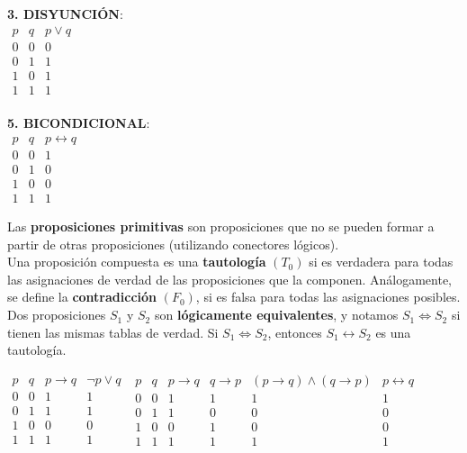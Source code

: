 \documentclass[11pt,a4paper]{article}
\begin{document}
\begin{multicols}{3}
\noindent \textbf{3. DISYUNCI\'ON}: \\
\indent $\begin{array}{|cc|c|}
p & q & p \lor q\\
\hline
0 & 0 & 0\\
0 & 1 & 1\\
1 & 0 & 1\\
1 & 1 & 1
\end{array}$\\ \\

\noindent \textbf{5. BICONDICIONAL}: \\
\indent $\begin{array}{|cc|c|}
p & q & p \leftrightarrow q\\
\hline
0 & 0 & 1\\
0 & 1 & 0\\
1 & 0 & 0\\
1 & 1 & 1
\end{array}$\\
\end{multicols}

\noindent Las \textbf{proposiciones primitivas} son proposiciones que no se pueden formar a partir de otras proposiciones (utilizando conectores l\'ogicos).\\

\noindent Una proposici\'on compuesta es una \textbf{tautolog\'ia} $(T_0)$ si es verdadera para todas las asignaciones de verdad de las proposiciones que la componen. An\'alogamente, se define la \textbf{contradicci\'on} $(F_0)$, si es falsa para todas las asignaciones posibles.\\

\noindent Dos proposiciones $S_1$ y $S_2$ son \textbf{l\'ogicamente equivalentes}, y notamos $S_1 \Leftrightarrow S_2$ si tienen las mismas tablas de verdad. Si $S_1 \Leftrightarrow S_2$, entonces $S_1 \leftrightarrow S_2$ es una tautolog\'ia.

\begin{table}[h]
\quad\quad\quad\quad
$\begin{array}{|cc|c|c|}
p & q & p \rightarrow q & \lnot p \lor q\\
\hline
0 & 0 & 1 & 1\\
0 & 1 & 1 & 1\\
1 & 0 & 0 & 0\\
1 & 1 & 1 & 1
\end{array}$
\quad\quad\quad
$\begin{array}{|cc|c|c|c|c|}
p & q & p \rightarrow q & q \rightarrow p & (p \rightarrow q) \land (q \rightarrow p) & p \leftrightarrow q\\
\hline
0 & 0 & 1 & 1 & 1 & 1\\
0 & 1 & 1 & 0 & 0 & 0\\
1 & 0 & 0 & 1 & 0 & 0\\
1 & 1 & 1 & 1 & 1 & 1
\end{array}$
\end{table}
\end{document}

